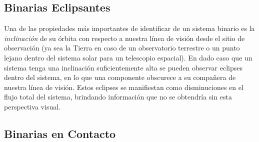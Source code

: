 \subsection{Binarias Eclipsantes}

Una de las propiedades más importantes de identificar de un sistema binario es la \textit{inclinación} de su órbita con respecto a nuestra línea de visión desde el sitio de observación (ya sea la Tierra en caso de un observatorio terrestre o un punto lejano dentro del sistema solar para un telescopio espacial). En dado caso que un sistema tenga una inclinación suficientemente alta se pueden observar eclipses dentro del sistema, en lo que una componente obscurece a su compañera de nuestra línea de visión. Estos eclipses se manifiestan como disminuciones en el flujo total del sistema, brindando información que no se obtendría sin esta perspectiva visual. 

\subsection{Binarias en Contacto}